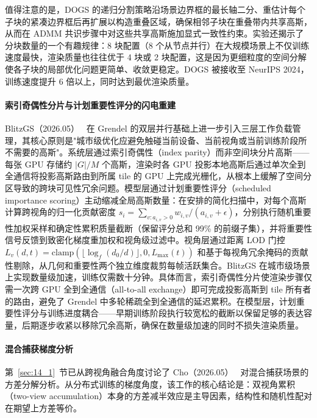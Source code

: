 值得注意的是，DOGS 的递归分割策略沿场景边界框的最长轴二分、重估计每个子块的紧凑边界框后再扩展以构造重叠区域，确保相邻子块在重叠带内共享高斯，从而在 ADMM 共识步骤中对这些共享高斯施加显式一致性约束。实验还揭示了分块数量的一个有趣规律：8 块配置（8 个从节点并行）在大规模场景上不仅训练速度最快，渲染质量也往往优于 4 块或 2 块配置，这是因为更细粒度的空间分解使各子块的局部优化问题更简单、收敛更稳定。DOGS 被接收至 NeurIPS 2024，训练速度提升 6 倍以上，同时达到最优渲染质量。

\paragraph{索引奇偶性分片与计划重要性评分的闪电重建}

BlitzGS（2026.05）~\cite{2605_13794} 在 Grendel 的双层并行基础上进一步引入三层工作负载管理，其核心原则是"城市级优化应避免触碰当前设备、当前视角或当前训练阶段所不需要的高斯"。系统层通过索引奇偶性（index parity）而非空间块分片高斯——每张 GPU 存储约 $|G|/M$ 个高斯，渲染时各 GPU 投影本地高斯后通过单次全到全通信将投影高斯路由到所属 tile 的 GPU 上完成光栅化，从根本上缓解了空间分区导致的跨块可见性冗余问题。模型层通过计划重要性评分（scheduled importance scoring）主动缩减全局高斯数量：在安排的简化扫描中，对每个高斯计算跨视角的归一化贡献密度 $s_i = \sum_{v: a_{i,v} > 0} w_{i,v} / (a_{i,v} + \epsilon)$，分别执行随机重要性加权采样和确定性累积质量截断（保留评分总和 99\% 的前缀子集），并将重要性信号反馈到致密化梯度重加权和视角级过滤中。视角层通过距离 LOD 门控 $L_v(d, t) = \text{clamp}(\lfloor\log_{f}(d_0/d)\rfloor, 0, L_{\max}(t))$ 和基于每视角冗余掩码的贡献性剔除，从几何和重要性两个独立维度裁剪每帧活跃集合。BlitzGS 在城市级场景上实现数量级加速，训练仅需数十分钟。具体而言，索引奇偶性分片使渲染步骤仅需一次跨 GPU 全到全通信（all-to-all exchange）即可完成投影高斯到 tile 所有者的路由，避免了 Grendel 中多轮稀疏全到全通信的延迟累积。在模型层，计划重要性评分与训练进度耦合——早期训练阶段执行较宽松的截断以保留足够的表达容量，后期逐步收紧以移除冗余高斯，确保在数量级加速的同时不损失渲染质量。

\paragraph{混合捕获梯度分析}

第~\ref{sec:14_1}~节已从跨视角融合角度讨论了 Cho（2026.05）~\cite{2605_00052} 对混合捕获场景的方差分解分析。从分布式训练的梯度角度，该工作的核心结论是：双视角累积（two-view accumulation）本身的方差减半效应是主导因素，结构性和随机性配对在期望上方差等价。

